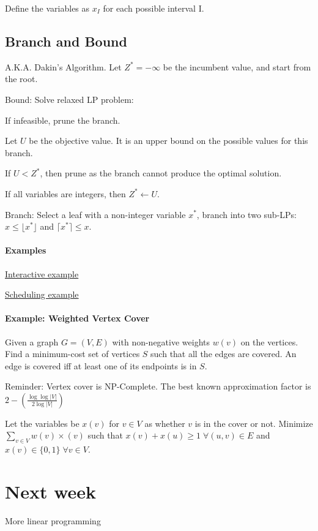 \documentclass[a4paper]{article}
\newenvironment{itemize*}%
  {\begin{itemize}%
    \setlength{\itemsep}{0pt}%
    \setlength{\parsep}{0pt}%
    \setlength{\parskip}{0pt}}%
  {\end{itemize}}
\newenvironment{enumerate*}%
  {\begin{enumerate}%
    \setlength{\itemsep}{0.5pt}%
    \setlength{\parsep}{0pt}%
    \setlength{\parskip}{0pt}}%
  {\end{enumerate}}
\begin{document}
Define the variables as $x_I$ for each possible interval I.

\subsection{Branch and Bound}
A.K.A. Dakin's Algorithm.
Let $Z^* = -\infty$ be the incumbent value, and start from the root.

Bound: Solve relaxed LP problem:
\begin{enumerate*}
  \item If infeasible, prune the branch.
  \item Let $U$ be the objective value. It is an upper bound on the possible values for this branch.
  \item If $U < Z^*$, then prune as the branch cannot produce the optimal solution.
  \item If all variables are integers, then $Z^* \gets U$.
\end{enumerate*}

Branch: Select a leaf with a non-integer variable $x^*$, branch into two sub-LPs: $x \le \lfloor x^* \rfloor$ and $\lceil x^* \rceil \le x$.

\paragraph{Examples}

\begin{itemize*}
  \item \href{http://optlab-server.sce.carleton.ca/POAnimations2007/MILP.html}{Interactive example}
  \item \href{http://optlab-server.sce.carleton.ca/POAnimations2007/BranchAndBound.html}{Scheduling example}
\end{itemize*}

\paragraph{Example: Weighted Vertex Cover}
Given a graph $G=(V,E)$ with non-negative weights $w(v)$ on the vertices.
Find a minimum-cost set of vertices $S$ such that all the edges are covered.
An edge is covered iff at least one of its endpoints is in $S$.

Reminder: Vertex cover is NP-Complete. The best known approximation factor is $2-\left( \frac{\log \log |V|}{2 \log |V|} \right)$

Let the variables be $x(v)$ for $v\in V$ as whether $v$ is in the cover or not.
Minimize $\sum_{v\in V} w(v) \times (v)$ such that $x(v) + x(u) \ge 1 \; \forall (u,v) \in E$ and $x(v) \in \{0,1\} \; \forall v\in V$.

\section{Next week}
More linear programming
\end{document}
